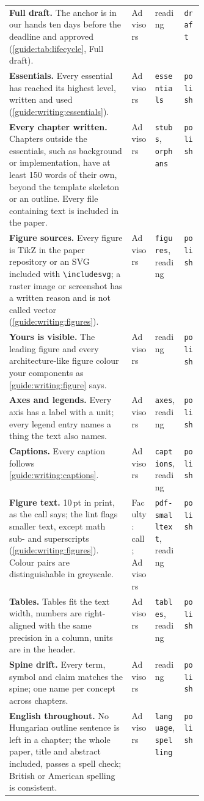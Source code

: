 {\begin{xltabular}{\linewidth}{X >{\raggedright\arraybackslash}p{0.12\linewidth} >{\raggedright\arraybackslash}p{0.15\linewidth} >{\raggedright\arraybackslash}p{0.1\linewidth}}
  \textbf{Full draft.} The anchor is in our hands ten days before the deadline and approved (\cref{guide:tab:lifecycle}, Full draft). & Advisors & reading & \texttt{draft} \\
  \textbf{Essentials.} Every essential has reached its highest level, written and used (\cref{guide:writing:essentials}). & Advisors & \texttt{essentials} & \texttt{polish} \\
  \textbf{Every chapter written.} Chapters outside the essentials, such as background or implementation, have at least 150 words of their own, beyond the template skeleton or an outline. Every file containing text is included in the paper. & Advisors & \texttt{stubs}, \texttt{orphans} & \texttt{polish} \\
  \textbf{Figure sources.} Every figure is TikZ in the paper repository or an SVG included with \texttt{\textbackslash includesvg}; a raster image or screenshot has a written reason and is not called vector (\cref{guide:writing:figures}). & Advisors & \texttt{figures}, reading & \texttt{polish} \\
  \textbf{Yours is visible.} The leading figure and every architecture-like figure colour your components as \cref{guide:writing:figure} says. & Advisors & reading & \texttt{polish} \\
  \textbf{Axes and legends.} Every axis has a label with a unit; every legend entry names a thing the text also names. & Advisors & \texttt{axes}, reading & \texttt{polish} \\
  \textbf{Captions.} Every caption follows \cref{guide:writing:captions}. & Advisors & \texttt{captions}, reading & \texttt{polish} \\
  \textbf{Figure text.} 10\,pt in print, as the call says; the lint flags smaller text, except math sub- and superscripts (\cref{guide:writing:figures}). Colour pairs are distinguishable in greyscale. & Faculty: call; Advisors & \texttt{pdf-smalltext}, reading & \texttt{polish} \\
  \textbf{Tables.} Tables fit the text width, numbers are right-aligned with the same precision in a column, units are in the header. & Advisors & \texttt{tables}, reading & \texttt{polish} \\
  \textbf{Spine drift.} Every term, symbol and claim matches the spine; one name per concept across chapters. & Advisors & reading & \texttt{polish} \\
  \textbf{English throughout.} No Hungarian outline sentence is left in a chapter; the whole paper, title and abstract included, passes a spell check; British or American spelling is consistent. & Advisors & \texttt{language}, \texttt{spelling} & \texttt{polish} \\

\end{xltabular}}
